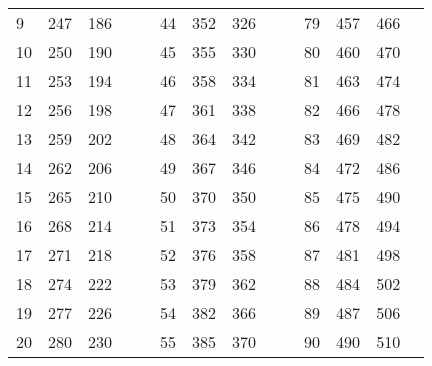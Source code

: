 \begin{table}[!h]
\begin{tabular}{|l|l|l|ll|l|l|l|llllll}
		9 & 247 & 186 &  &  & 44 & 352 & 326 &  & \multicolumn{1}{l|}{} & \multicolumn{1}{l|}{79} & \multicolumn{1}{l|}{457} & \multicolumn{1}{l|}{466} &  \\ \cline{1-3} \cline{6-8} \cline{11-13}
		10 & 250 & 190 &  &  & 45 & 355 & 330 &  & \multicolumn{1}{l|}{} & \multicolumn{1}{l|}{80} & \multicolumn{1}{l|}{460} & \multicolumn{1}{l|}{470} &  \\ \cline{1-3} \cline{6-8} \cline{11-13}
		11 & 253 & 194 &  &  & 46 & 358 & 334 &  & \multicolumn{1}{l|}{} & \multicolumn{1}{l|}{81} & \multicolumn{1}{l|}{463} & \multicolumn{1}{l|}{474} &  \\ \cline{1-3} \cline{6-8} \cline{11-13}
		12 & 256 & 198 &  &  & 47 & 361 & 338 &  & \multicolumn{1}{l|}{} & \multicolumn{1}{l|}{82} & \multicolumn{1}{l|}{466} & \multicolumn{1}{l|}{478} &  \\ \cline{1-3} \cline{6-8} \cline{11-13}
		13 & 259 & 202 &  &  & 48 & 364 & 342 &  & \multicolumn{1}{l|}{} & \multicolumn{1}{l|}{83} & \multicolumn{1}{l|}{469} & \multicolumn{1}{l|}{482} &  \\ \cline{1-3} \cline{6-8} \cline{11-13}
		14 & 262 & 206 &  &  & 49 & 367 & 346 &  & \multicolumn{1}{l|}{} & \multicolumn{1}{l|}{84} & \multicolumn{1}{l|}{472} & \multicolumn{1}{l|}{486} &  \\ \cline{1-3} \cline{6-8} \cline{11-13}
		15 & 265 & 210 &  &  & 50 & 370 & 350 &  & \multicolumn{1}{l|}{} & \multicolumn{1}{l|}{85} & \multicolumn{1}{l|}{475} & \multicolumn{1}{l|}{490} &  \\ \cline{1-3} \cline{6-8} \cline{11-13}
		16 & 268 & 214 &  &  & 51 & 373 & 354 &  & \multicolumn{1}{l|}{} & \multicolumn{1}{l|}{86} & \multicolumn{1}{l|}{478} & \multicolumn{1}{l|}{494} &  \\ \cline{1-3} \cline{6-8} \cline{11-13}
		17 & 271 & 218 &  &  & 52 & 376 & 358 &  & \multicolumn{1}{l|}{} & \multicolumn{1}{l|}{87} & \multicolumn{1}{l|}{481} & \multicolumn{1}{l|}{498} &  \\ \cline{1-3} \cline{6-8} \cline{11-13}
		18 & 274 & 222 &  &  & 53 & 379 & 362 &  & \multicolumn{1}{l|}{} & \multicolumn{1}{l|}{88} & \multicolumn{1}{l|}{484} & \multicolumn{1}{l|}{502} &  \\ \cline{1-3} \cline{6-8} \cline{11-13}
		19 & 277 & 226 &  &  & 54 & 382 & 366 &  & \multicolumn{1}{l|}{} & \multicolumn{1}{l|}{89} & \multicolumn{1}{l|}{487} & \multicolumn{1}{l|}{506} &  \\ \cline{1-3} \cline{6-8} \cline{11-13}
		20 & 280 & 230 &  &  & 55 & 385 & 370 &  & \multicolumn{1}{l|}{} & \multicolumn{1}{l|}{90} & \multicolumn{1}{l|}{490} & \multicolumn{1}{l|}{510} &  \\ \cline{1-3} \cline{6-8} \cline{11-13}

\end{tabular}
\end{table}
